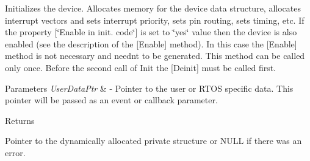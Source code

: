 Initializes the device. Allocates memory for the device data structure, allocates interrupt vectors and sets interrupt priority, sets pin routing, sets timing, etc. If the property \mbox{[}\char`\"{}\+Enable in init. code\char`\"{}\mbox{]} is set to \char`\"{}yes\char`\"{} value then the device is also enabled (see the description of the \mbox{[}Enable\mbox{]} method). In this case the \mbox{[}Enable\mbox{]} method is not necessary and needn\textquotesingle{}t to be generated. This method can be called only once. Before the second call of Init the \mbox{[}Deinit\mbox{]} must be called first. 


\begin{DoxyParams}{Parameters}
{\em User\+Data\+Ptr} & -\/ Pointer to the user or R\+T\+OS specific data. This pointer will be passed as an event or callback parameter. \\
\hline
\end{DoxyParams}
\begin{DoxyReturn}{Returns}

\begin{DoxyItemize}
\item Pointer to the dynamically allocated private structure or N\+U\+LL if there was an error. 
\end{DoxyItemize}
\end{DoxyReturn}
